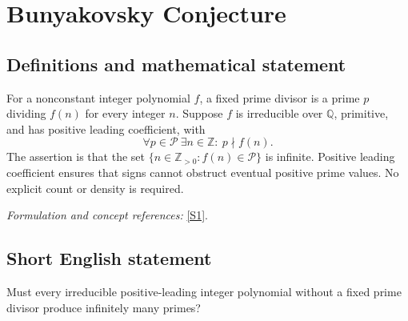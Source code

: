 \documentclass[11pt]{article}
\newcommand{\Z}{\mathbb{Z}}
\newcommand{\Q}{\mathbb{Q}}
\newcommand{\sref}[2]{\hyperlink{source:#1:#2}{[S#2]}}
\newif\ifshowcatalogue
\newcommand{\cataloguescope}[1]{\ifshowcatalogue
 \paragraph{Exact scope in the supplied catalogue.}
 \begin{quote}\small #1\end{quote}\fi}
\begin{document}
\setcounter{section}{0}
\clearpage
\section*{\texorpdfstring{Bunyakovsky Conjecture}{Bunyakovsky Conjecture}}\label{statement}
\subsection{Definitions and mathematical statement}
For a nonconstant integer polynomial $f$, a fixed prime divisor is a prime $p$ dividing $f(n)$ for every integer $n$. Suppose $f$ is irreducible over $\Q$, primitive, and has positive leading coefficient, with
\[
 \forall p\in\mathcal P\ \exists n\in\Z:\ p\nmid f(n).
\]
The assertion is that the set $\{n\in\Z_{>0}:f(n)\in\mathcal P\}$ is infinite. Positive leading coefficient ensures that signs cannot obstruct eventual positive prime values. No explicit count or density is required.
\par\smallskip\textit{Formulation and concept references:} \sref{statement}{1}.
\cataloguescope{Prove or disprove that every irreducible polynomial f in Z[x] with positive leading coefficient and no fixed prime divisor takes prime values for infinitely many positive integer inputs.}

\subsection{Short English statement}
Must every irreducible positive-leading integer polynomial without a fixed prime divisor produce infinitely many primes?
\end{document}
